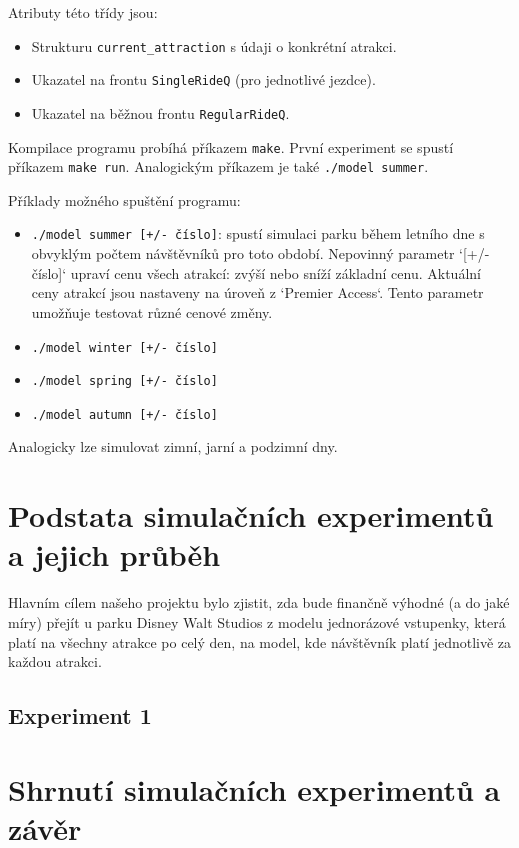 \documentclass[a4paper,12pt]{article}
\begin{document}
Atributy této třídy jsou: 

\begin{itemize}
    \item Strukturu \texttt{current\_attraction} s údaji o konkrétní atrakci.  
    \item Ukazatel na frontu \texttt{SingleRideQ} (pro jednotlivé jezdce).  
    \item Ukazatel na běžnou frontu \texttt{RegularRideQ}.  
\end{itemize} 


Kompilace programu probíhá příkazem \texttt{make}.  
První experiment se spustí příkazem \texttt{make run}.  
Analogickým příkazem je také \texttt{./model summer}.  

Příklady možného spuštění programu:  
\begin{itemize}
    \item \texttt{./model summer [+/- číslo]}: spustí simulaci parku během letního dne s obvyklým počtem návštěvníků pro toto období. Nepovinný parametr `[+/- číslo]` upraví cenu všech atrakcí: zvýší nebo sníží základní cenu. Aktuální ceny atrakcí jsou nastaveny na úroveň z `Premier Access`. Tento parametr umožňuje testovat různé cenové změny.
    \item \texttt{./model winter [+/- číslo]} 
    \item \texttt{./model spring [+/- číslo]}
    \item \texttt{./model autumn [+/- číslo]}
\end{itemize} 
Analogicky lze simulovat zimní, jarní a podzimní dny.  



\section{Podstata simulačních experimentů a jejich průběh}

Hlavním cílem našeho projektu bylo zjistit, zda bude finančně výhodné (a do jaké míry) přejít u parku Disney Walt Studios z modelu jednorázové vstupenky, která platí na všechny atrakce po celý den, na model, kde návštěvník platí jednotlivě za každou atrakci.

\subsection{Experiment 1}

\section{Shrnutí simulačních experimentů a závěr}

 
\end{document}
